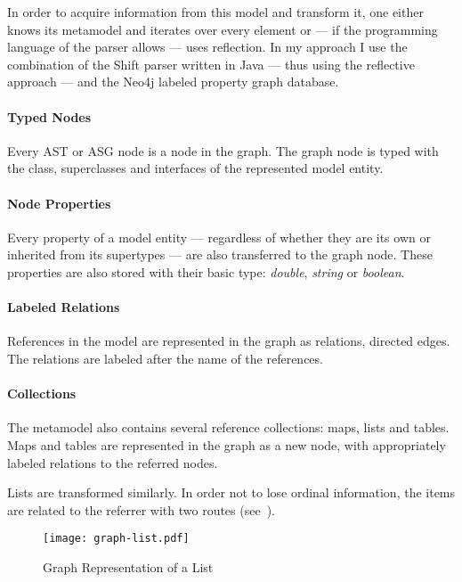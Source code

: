 In order to acquire information from this model and transform it, one either knows its metamodel and iterates over every element or --- if the programming language of the parser allows --- uses reflection. In my approach I use the combination of the Shift parser written in Java --- thus using the reflective approach --- and the Neo4j labeled property graph database.

\paragraph{Typed Nodes}
Every AST or ASG node is a node in the graph. The graph node is typed with the class, superclasses and interfaces of the represented model entity.


\paragraph{Node Properties}
Every property of a model entity --- regardless of whether they are its own or inherited from its supertypes --- are also transferred to the graph node. These properties are also stored with their basic type: \emph{double}, \emph{string} or \emph{boolean}.

\paragraph{Labeled Relations}
References in the model are represented in the graph as relations, directed edges. The relations are labeled after the name of the references.

\paragraph{Collections}
The metamodel also contains several reference collections: maps, lists and tables. Maps and tables are represented in the graph as a new node, with appropriately labeled relations to the referred nodes.

Lists are transformed similarly. In order not to lose ordinal information, the items are related to the referrer with two routes (see~).

\begin{figure}[!htb]
  \centering
  \texttt{[image: graph-list.pdf]}
  \caption{Graph Representation of a List}
  \label{fig:graph-list}
\end{figure}

